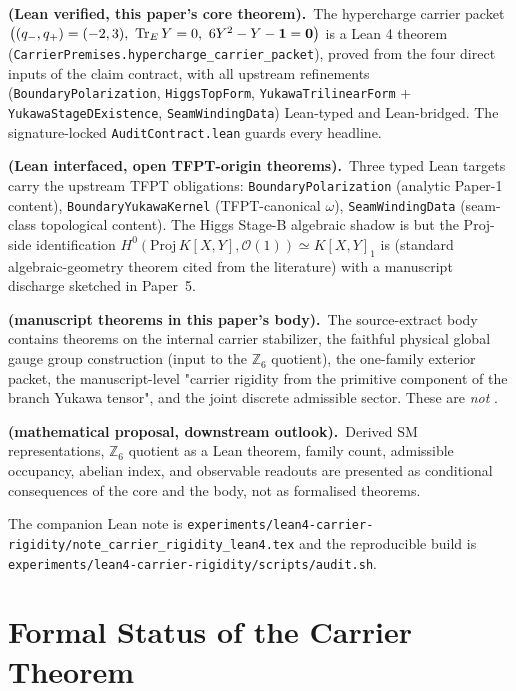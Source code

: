 \documentclass[11pt,a4paper]{article}
\begin{document}
\begin{tfptstatusbox}
\textbf{ (Lean verified, this paper's core theorem).}\
The hypercharge carrier packet
$\bigl((q_-,q_+)=(-2,3),\ \operatorname{Tr}_E Y = 0,\ 6 Y^2 - Y - \mathbf 1 = \mathbf 0\bigr)$
is a Lean 4 theorem
(\texttt{CarrierPremises.hypercharge\_carrier\_packet}),
proved from the four direct inputs of the claim contract,
with all upstream refinements (\texttt{BoundaryPolarization},
\texttt{HiggsTopForm}, \texttt{YukawaTrilinearForm} +
\texttt{YukawaStageDExistence}, \texttt{SeamWindingData})
Lean-typed and Lean-bridged. The signature-locked
\texttt{AuditContract.lean} guards every headline.

\smallskip
\textbf{ (Lean interfaced, open TFPT-origin theorems).}\
Three typed Lean targets carry the upstream TFPT obligations:
\texttt{BoundaryPolarization} (analytic Paper-1 content),
\texttt{BoundaryYukawaKernel} (TFPT-canonical $\omega$),
\texttt{SeamWindingData} (seam-class topological content).
The Higgs Stage-B algebraic shadow is \stag{L} but the
$\mathrm{Proj}$-side identification
$H^0(\mathrm{Proj}\,K[X,Y], \mathcal O(1)) \simeq K[X,Y]_1$
is \stag{S} (standard algebraic-geometry theorem cited from
the literature) with a manuscript discharge sketched in
Paper~5.

\smallskip
\textbf{ (manuscript theorems in this paper's body).}\
The source-extract body contains  theorems on the
internal carrier stabilizer, the faithful physical global
gauge group construction (input to the $\mathbb Z_6$ quotient),
the one-family exterior packet, the manuscript-level
"carrier rigidity from the primitive component of the branch
Yukawa tensor", and the joint discrete admissible sector.
These are \emph{not} .

\smallskip
\textbf{ (mathematical proposal, downstream outlook).}\
Derived SM representations, $\mathbb Z_6$ quotient as a Lean
theorem, family count, admissible occupancy, abelian index,
and observable readouts are presented as conditional
consequences of the \stag{L} core and the \stag{M} body,
not as formalised theorems.

\smallskip
The companion Lean note is
\texttt{experiments/lean4-carrier-rigidity/note\_carrier\_rigidity\_lean4.tex}
and the reproducible build is
\texttt{experiments/lean4-carrier-rigidity/scripts/audit.sh}.
\end{tfptstatusbox}

\tableofcontents

\section{Formal Status of the Carrier Theorem}
\label{sec:formal-status}
\end{document}
